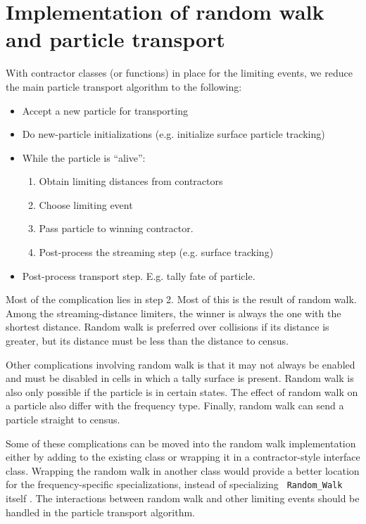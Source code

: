 \documentclass[memo]{ResearchNote}
\begin{document}
\section{Implementation of random walk and particle transport}

With contractor classes (or functions) in place for the limiting
events, we reduce the main particle transport algorithm to the
following:

\begin{itemize}
  \item Accept a new particle for transporting
  \item Do new-particle initializations (e.g. initialize surface
    particle tracking)
  \item While the particle is ``alive'':
    \begin{enumerate}
    \item Obtain limiting distances from contractors
    \item Choose limiting event
    \item Pass particle to winning contractor.
    \item Post-process the streaming step (e.g. surface tracking)
    \end{enumerate}
  \item Post-process transport step. E.g. tally fate of particle.
\end{itemize}

Most of the complication lies in step 2. Most of this is the result of
random walk. Among the streaming-distance limiters, the winner is
always the one with the shortest distance. Random walk is preferred
over collisions if its distance is greater, but its distance must be
less than the distance to census. 

Other complications involving random walk is that it may not always
be enabled and must be disabled in cells in which a tally surface is
present. Random walk is also only possible if the particle is in
certain states. The effect of random walk on a particle also differ
with the frequency type. Finally, random walk can send a particle
straight to census. 

Some of these complications can be moved into the random walk
implementation either by adding to the existing class or wrapping it
in a contractor-style interface class. Wrapping the random walk in
another class would provide a better location for the
frequency-specific specializations, instead of specializing {\tt
  Random\_Walk} itself . The interactions between random walk and other
limiting events should be handled in the particle transport algorithm.
\end{document}
